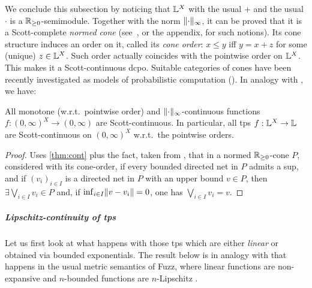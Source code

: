 We conclude this subsection by noticing that $\mathbb{L}^X$ with the usual $+$ and the usual $\cdot$ is a $\mathbb{R}_{\geq0}$-semimodule.
Together with the norm $\lVert\cdot\rVert_\infty$, it can be proved that it is a Scott-complete \emph{normed cone} (see~\cite{Selinger2004}, or the appendix, for such notions).
Its cone structure induces an order on it, called its \emph{cone order}:
$x\leq y$ iff $y=x+z$ for some (unique) $z\in\mathbb{L}^X$.
Such order actually coincides with the pointwise order on $\mathbb{L}^X$.
This makes it a Scott-continuous dcpo.
Suitable categories of cones have been recently investigated as models of probabilistic computation (\cite{Crubillie2018, EhrPagTas2018, Ehrhard2020}).
In analogy with \cite[Proposition 17]{DanEhrh2011}, we have:

\begin{theorem}\label{thm:ScottCont}
 All monotone (w.r.t.\ pointwise order) and $\lVert\cdot\rVert_{\infty}$-continuous functions $f:(0,\infty)^X\to (0,\infty)$ are Scott-continuous.
 In particular, all tps $f:\mathbb{L}^X\to\mathbb{L}$ are Scott-continuous on $(0,\infty)^X$ w.r.t.\ the pointwise orders.
\end{theorem}
\begin{proof}
 Uses \autoref{thm:cont} plus the fact, taken from \cite{Selinger2004}, that in a normed $\mathbb{R}_{\geq 0}$-cone $P$, considered with its cone-order, if every bounded directed net in $P$ admits a sup, and if $(v_i)_{i\in I}$ is a directed net in $P$ with an upper bound $v\in P$, then $\exists\bigvee_{i\in I} v_i \in P$ and, if $\inf_{i\in I} \lVert v-v_i\rVert =0$, one has $\bigvee_{i\in I} v_i = v$.
\end{proof}



\subparagraph*{Lipschitz-continuity of tps}\label{sec:4C}%



Let us first look at what happens with those tps which are either \emph{linear} or obtained via bounded exponentials.
The result below is in analogy with that happens in the usual metric semantics of Fuzz, where 
linear functions are non-expansive and $n$-bounded functions are $n$-Lipschitz \cite{Reed2010}.


